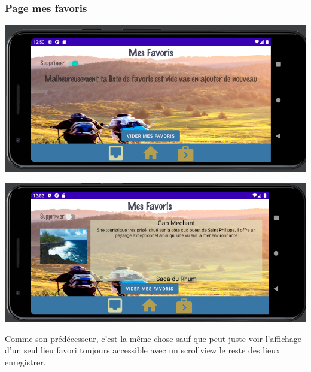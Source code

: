 \documentclass{article}
\begin{document}
{\color{purple}\subsubsection{Page mes favoris}}
\begin{minipage}{0.45\textwidth}
\includegraphics[width=\textwidth]{Mes_favoris_vide_p}
\end{minipage}
\hfill
\begin{minipage}{0.48\textwidth}
\includegraphics[width=\textwidth]{Mes_favoris_p}
\end{minipage}
Comme son prédécesseur, c'est la même chose sauf que peut juste voir l'affichage d'un seul lieu favori toujours accessible avec un scrollview le reste des lieux enregistrer. 
\end{document}
